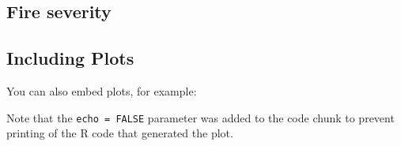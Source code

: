 \documentclass[
]{article}
\begin{document}
\hypertarget{fire-severity}{%
\subsection{Fire severity}\label{fire-severity}}

\hypertarget{including-plots}{%
\subsection{Including Plots}\label{including-plots}}

You can also embed plots, for example:

Note that the \texttt{echo\ =\ FALSE} parameter was added to the code
chunk to prevent printing of the R code that generated the plot.
\end{document}
